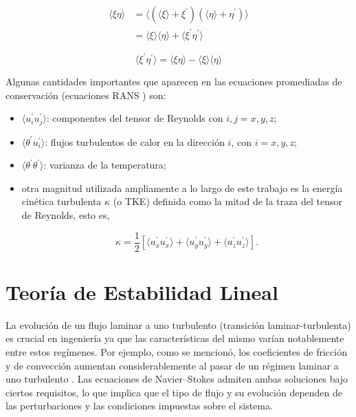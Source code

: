 \begin{equation}
\begin{aligned}
\langle \xi \eta \rangle &= \langle (\langle \xi \rangle + \xi^{\prime}) (\langle \eta \rangle + \eta^{\prime}) \rangle \\
                         &= \langle \xi \rangle \langle \eta \rangle + \langle \xi^{\prime} \eta^{\prime} \rangle
\end{aligned}
\label{eq:mag-cov}
\end{equation}

\begin{equation}
\langle \xi^{\prime} \eta^{\prime} \rangle = \langle \xi \eta \rangle - \langle \xi \rangle \langle \eta \rangle
\label{eq:fluct-corr}
\end{equation}

Algunas cantidades importantes que aparecen en las ecuaciones promediadas de conservación (ecuaciones RANS \cite{kundu}) son:

\begin{itemize}
	\item $\langle u^{\prime}_i u^{\prime}_j \rangle$: componentes del tensor de Reynolds con $i,j=x,y,z$;
	\item $\langle \theta^{\prime} u^{\prime}_i \rangle$: flujos turbulentos de calor en la dirección $i$, con $i=x,y,z$;
	\item $\langle \theta^{\prime} \theta^{\prime} \rangle$: varianza de la temperatura;

	\item otra magnitud utilizada ampliamente a lo largo de este trabajo es la energía cinética turbulenta $\kappa$ (o TKE) definida como la mitad de la traza del tensor de Reynolds, esto es, 

\begin{equation}
\kappa = \frac{1}{2} \left[ \langle u^{\prime}_x u^{\prime}_x \rangle + \langle u^{\prime}_y u^{\prime}_y \rangle + \langle u^{\prime}_z u^{\prime}_z \rangle \right] \text{.}
\label{eq:tke}
\end{equation}

\end{itemize}


\section{Teoría de Estabilidad Lineal} \label{line_an}

La evolución de un flujo laminar a uno turbulento (transición laminar-turbulenta) es crucial en ingeniería ya que las características del mismo varían notablemente entre estos regímenes. Por ejemplo, como se mencionó, los coeficientes de fricción y de convección aumentan considerablemente al pasar de un régimen laminar a uno turbulento \cite{machaca2024}. Las ecuaciones de Navier–Stokes admiten ambas soluciones bajo ciertos requisitos, lo que implica que el tipo de flujo y su evolución dependen de las perturbaciones y las condiciones impuestas sobre el sistema. 

